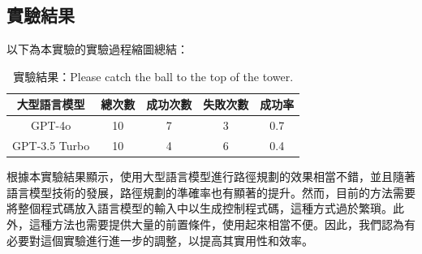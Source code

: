 \documentclass[class=NCU_thesis, crop=false]{standalone}
\begin{document}
\subsection{實驗結果}
以下為本實驗的實驗過程縮圖總結：\\

\begin{table}[h]
    \centering
    \caption{實驗結果：Please catch the ball to the top of the tower.}
    \begin{tabular}{ccccc}
    \hline
    大型語言模型 & 總次數 & 成功次數 & 失敗次數 & 成功率 \\
    \hline
    GPT-4o & 10 & 7 & 3 & 0.7\\
    \hline
    GPT-3.5 Turbo & 10 & 4 & 6 & 0.4\\
    \hline
    \end{tabular}
\end{table}

根據本實驗結果顯示，使用大型語言模型進行路徑規劃的效果相當不錯，並且隨著語言模型技術的發展，路徑規劃的準確率也有顯著的提升。然而，目前的方法需要將整個程式碼放入語言模型的輸入中以生成控制程式碼，這種方式過於繁瑣。此外，這種方法也需要提供大量的前置條件，使用起來相當不便。因此，我們認為有必要對這個實驗進行進一步的調整，以提高其實用性和效率。
\end{document}
